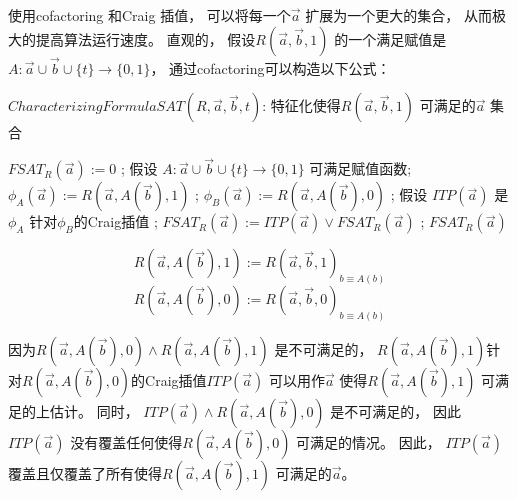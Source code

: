 使用cofactoring  和Craig 插值，
可以将每一个$\vec{a}$ 扩展为一个更大的集合，
从而极大的提高算法运行速度。
直观的，
假设$R(\vec{a},\vec{b},1)$ 的一个满足赋值是$A:\vec{a}\cup\vec{b}\cup\{t\}\to\{0,1\}$，
通过cofactoring可以构造以下公式：

\begin{algorithm}[t]
\caption{$CharacterizingFormulaSAT(R,\vec{a},\vec{b},t)$: 特征化使得$R(\vec{a},\vec{b},1)$ 可满足的$\vec{a}$ 集合}
\label{alg_craigchar}
\begin{algorithmic}[1]
\label{initcondition}
\STATE $FSAT_R(\vec{a}):= 0$ ;
\label{testsat}
  \STATE 假设 $A:\vec{a}\cup\vec{b}\cup\{t\}\rightarrow \{0,1\}$ 可满足赋值函数;
  \STATE $\phi_A(\vec{a}):= R(\vec{a},A(\vec{b}),1)$ ;
\label{cofact1}
  \STATE $\phi_B(\vec{a}):= R(\vec{a},A(\vec{b}),0)$ ;
\label{cofact2}
  \STATE 假设 $ITP(\vec{a})$ 是$\phi_A$ 针对$\phi_B$的Craig插值 ;
\label{ab}
  \STATE $FSAT_R(\vec{a}):= ITP(\vec{a}) \vee FSAT_R(\vec{a})$ ;
\label{add}
\ENDWHILE
\RETURN $FSAT_R(\vec{a})$
\end{algorithmic}
\end{algorithm}

\begin{equation}
R(\vec{a},A(\vec{b}),1):=R(\vec{a},\vec{b},1)_{b\equiv A(b)}
\end{equation}
\begin{equation}
R(\vec{a},A(\vec{b}),0):=R(\vec{a},\vec{b},0)_{b\equiv A(b)}
\end{equation}

因为$R(\vec{a},A(\vec{b}),0)\wedge R(\vec{a},A(\vec{b}),1)$ 是不可满足的，
$R(\vec{a},A(\vec{b}),1)$针对$R(\vec{a},A(\vec{b}),0)$的Craig插值$ITP(\vec{a})$ 可以用作$\vec{a}$ 使得$R(\vec{a},A(\vec{b}),1)$ 可满足的上估计。
同时，
$ITP(\vec{a})\wedge R(\vec{a},A(\vec{b}),0)$ 是不可满足的，
因此$ITP(\vec{a})$ 没有覆盖任何使得$R(\vec{a},A(\vec{b}),0)$ 可满足的情况。
因此，
$ITP(\vec{a})$ 覆盖且仅覆盖了所有使得$R(\vec{a},A(\vec{b}),1)$ 可满足的$\vec{a}$。


